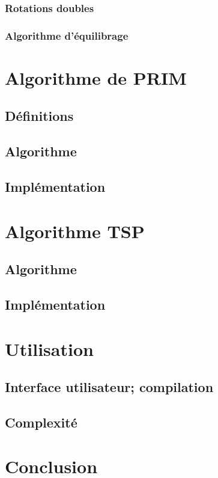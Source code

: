 \documentclass{article}
\begin{document}
\subsubsection{Rotations doubles}

\subsubsection{Algorithme d'équilibrage}

\section{Algorithme de PRIM}

\subsection{Définitions}

\subsection{Algorithme}

\subsection{Implémentation}

\section{Algorithme TSP}

\subsection{Algorithme}

\subsection{Implémentation}

\section{Utilisation}

\subsection{Interface utilisateur; compilation}

\subsection{Complexité}

\section*{Conclusion}



\end{document}
